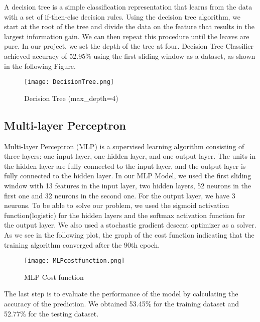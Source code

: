 A decision tree is a simple classification representation that learns from the data with a set of if-then-else decision rules.\newline \newline
Using the decision tree algorithm, we start at the root of the tree and divide the data on the feature that results in the largest information gain. We can then repeat this procedure until the leaves are pure.\newline \newline
In our project, we set the depth of the tree at four.\newline
Decision Tree Classifier achieved accuracy of 52.95\% using the first sliding window as a dataset, as shown in the following Figure.
\begin{figure}[H]
\begin{center}
\texttt{[image: DecisionTree.png]}
\end{center}
\caption{Decision Tree (max\_depth=4)}
\label{fig:DecisionTree}
\end{figure}


\subsection{Multi-layer Perceptron}

Multi-layer Perceptron (MLP) is a supervised learning algorithm consisting of three layers: one input layer, one hidden layer, and one output layer. The units in the hidden layer are fully connected to the input layer, and the output layer is fully connected to the hidden layer.\newline \newline %
In our MLP Model, we used the first sliding window with 13 features in the input layer, two hidden layers, 52 neurons in the first one and 32 neurons in the second one. For the output layer, we have 3 neurons.\newline \newline  
To be able to solve our problem, we used the sigmoid activation function(logistic) for the hidden layers and the softmax activation function for the output layer. We also used a stochastic gradient descent optimizer as a solver. \newline 
As we see in the following plot, the graph of the cost function indicating that the training algorithm converged after the 90th epoch. \newline
\begin{figure}[H]
\begin{center}
\texttt{[image: MLPcostfunction.png]}
\end{center}
\caption{MLP Cost function}
\label{fig:MLPcostfunction}
\end{figure}
The last step is to evaluate the performance of the model by calculating the accuracy of the prediction. We obtained 53.45\% for the training dataset and 52.77\% for the testing dataset.


